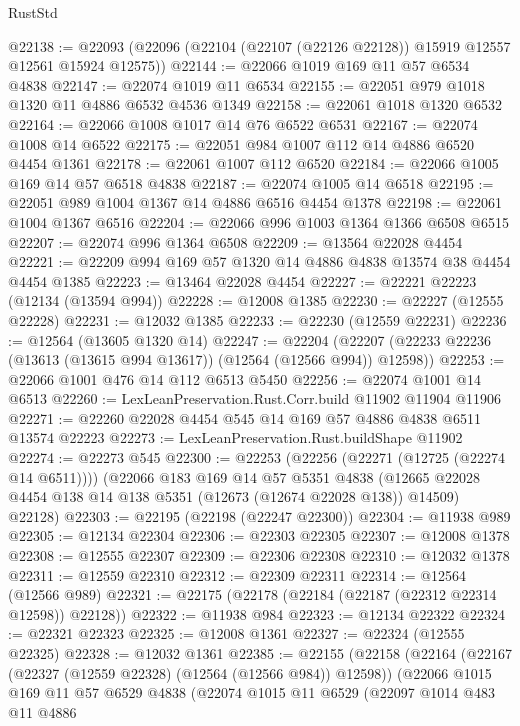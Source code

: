 \begin{lexlean}{RustStd}
\begin{coremodule}
{\begin{coremodule}
{{{{{{{{{{{{{{{{{{{{{{{{{{{{{{{{{{{{{{{{{{{{{{{{{{{{{{{{{{{{{{{{{{{{{{{{{{{{{{{{@22138 := @22093 (@22096 (@22104 (@22107 (@22126 @22128)) @15919 @12557 @12561 @15924 @12575))
@22144 := @22066 @1019 @169 @11 @57 @6534 @4838
@22147 := @22074 @1019 @11 @6534
@22155 := @22051 @979 @1018 @1320 @11 @4886 @6532 @4536 @1349
@22158 := @22061 @1018 @1320 @6532
@22164 := @22066 @1008 @1017 @14 @76 @6522 @6531
@22167 := @22074 @1008 @14 @6522
@22175 := @22051 @984 @1007 @112 @14 @4886 @6520 @4454 @1361
@22178 := @22061 @1007 @112 @6520
@22184 := @22066 @1005 @169 @14 @57 @6518 @4838
@22187 := @22074 @1005 @14 @6518
@22195 := @22051 @989 @1004 @1367 @14 @4886 @6516 @4454 @1378
@22198 := @22061 @1004 @1367 @6516
@22204 := @22066 @996 @1003 @1364 @1366 @6508 @6515
@22207 := @22074 @996 @1364 @6508
@22209 := @13564 @22028 @4454
@22221 := @22209 @994 @169 @57 @1320 @14 @4886 @4838 @13574 @38 @4454 @4454 @1385
@22223 := @13464 @22028 @4454
@22227 := @22221 @22223 (@12134 (@13594 @994))
@22228 := @12008 @1385
@22230 := @22227 (@12555 @22228)
@22231 := @12032 @1385
@22233 := @22230 (@12559 @22231)
@22236 := @12564 (@13605 @1320 @14)
@22247 := @22204
    (@22207 (@22233 @22236 (@13613 (@13615 @994 @13617)) (@12564 (@12566 @994)) @12598))
@22253 := @22066 @1001 @476 @14 @112 @6513 @5450
@22256 := @22074 @1001 @14 @6513
@22260 := LexLeanPreservation.Rust.Corr.build @11902 @11904 @11906
@22271 := @22260 @22028 @4454 @545 @14 @169 @57 @4886 @4838 @6511 @13574 @22223
@22273 := LexLeanPreservation.Rust.buildShape @11902
@22274 := @22273 @545
@22300 := @22253
    (@22256 (@22271 (@12725 (@22274 @14 @6511))))
    (@22066
      @183
      @169
      @14
      @57
      @5351
      @4838
      (@12665 @22028 @4454 @138 @14 @138 @5351 (@12673 (@12674 @22028 @138)) @14509)
      @22128)
@22303 := @22195 (@22198 (@22247 @22300))
@22304 := @11938 @989
@22305 := @12134 @22304
@22306 := @22303 @22305
@22307 := @12008 @1378
@22308 := @12555 @22307
@22309 := @22306 @22308
@22310 := @12032 @1378
@22311 := @12559 @22310
@22312 := @22309 @22311
@22314 := @12564 (@12566 @989)
@22321 := @22175 (@22178 (@22184 (@22187 (@22312 @22314 @12598)) @22128))
@22322 := @11938 @984
@22323 := @12134 @22322
@22324 := @22321 @22323
@22325 := @12008 @1361
@22327 := @22324 (@12555 @22325)
@22328 := @12032 @1361
@22385 := @22155
    (@22158
      (@22164
        (@22167 (@22327 (@12559 @22328) (@12564 (@12566 @984)) @12598))
        (@22066
          @1015
          @169
          @11
          @57
          @6529
          @4838
          (@22074
            @1015
            @11
            @6529
            (@22097
              @1014
              @483
              @11
              @4886
}}}}}}}}}}}}}}}}}}}}}}}}}}}}}}}}}}}}}}}}}}}}}}}}}}}}}}}}}}}}}}}}}}}}}}}}}}}}}}}}
\end{coremodule}}
\end{coremodule}
\end{lexlean}
